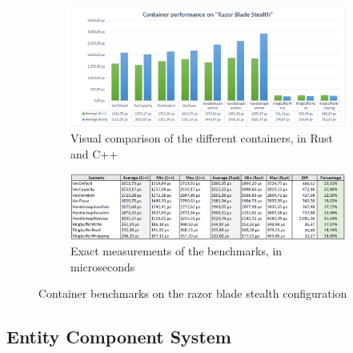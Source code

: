 \begin{figure}[h!]
	\centering
	\begin{subfigure}[b]{\textwidth}
		\includegraphics[width=1\linewidth]{PICs/container_bench_blade.png}
		\caption{Visual comparison of the different containers, in Rust and C++}
		\label{fig:Ng1} 
	\end{subfigure}
	
	\begin{subfigure}[b]{\textwidth}
		\includegraphics[width=1\linewidth]{PICs/container_bench_blade_data.png}
		\caption{Exact measurements of the benchmarks, in microseconds}
		\label{fig:Ng2}
	\end{subfigure}
	
	\caption[Container benchmarks blade]{Container benchmarks on the razor blade stealth configuration}
\end{figure}

\clearpage

\subsection{Entity Component System}

